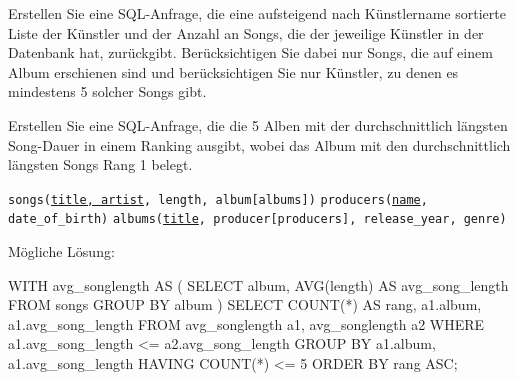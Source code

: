 \begin{frame}{Erstellen Sie eine SQL-Anfrage, die eine aufsteigend nach Künstlername sortierte Liste der Künstler und der Anzahl an Songs, die der jeweilige Künstler in der Datenbank hat, zurückgibt. Berücksichtigen Sie dabei nur Songs, die auf einem Album erschienen sind und berücksichtigen Sie nur Künstler, zu denen es mindestens 5 solcher Songs gibt.}

\vspace{2em}
\end{frame}

\begin{frame}{Erstellen Sie eine SQL-Anfrage, die die 5 Alben mit der durchschnittlich längsten Song-Dauer in einem Ranking ausgibt, wobei das Album mit den durchschnittlich längsten Songs Rang 1 belegt.}

\texttt{songs(\underline{title, artist}, length, album[albums])}
\newline
\texttt{producers(\underline{name}, date\_of\_birth)}
\newline
\texttt{albums(\underline{title}, producer[producers], release\_year, genre)}

\end{frame}

\begin{frame}{Mögliche Lösung:}

WITH avg\_songlength AS
\newline
(
\newline
	SELECT   album, AVG(length) AS avg\_song\_length
	\newline
	FROM     songs
	\newline
	GROUP BY album
 \newline
)
\newline
SELECT   COUNT(*) AS rang, a1.album, a1.avg\_song\_length
\newline
FROM     avg\_songlength a1, avg\_songlength a2
\newline
WHERE    a1.avg\_song\_length <= a2.avg\_song\_length
\newline
GROUP BY a1.album, a1.avg\_song\_length
\newline
HAVING   COUNT(*) <= 5
\newline
ORDER BY rang ASC;

\end{frame}

